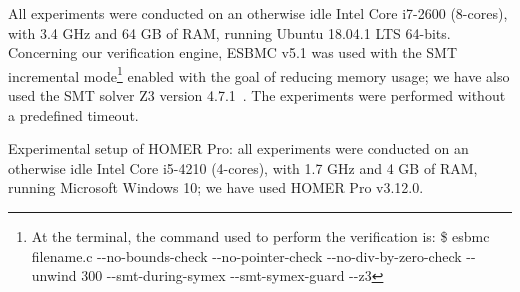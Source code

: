 \documentclass[journal]{IEEEtran}
\begin{document}
All experiments were conducted on an otherwise idle Intel Core i7-2600 (8-cores), with 3.4 GHz and 64 GB of RAM, running Ubuntu 18.04.1 LTS 64-bits. Concerning our verification engine, ESBMC v5.1 was used with the SMT incremental mode\footnote{At the terminal, the command used to perform the verification is: \$ esbmc filename.c -\phantom{}-no-bounds-check -\phantom{}-no-pointer-check -\phantom{}-no-div-by-zero-check -\phantom{}-unwind 300 -\phantom{}-smt-during-symex -\phantom{}-smt-symex-guard -\phantom{}-z3} enabled with the goal of reducing memory usage; we have also used the SMT solver Z3 version 4.7.1~\cite{DeMoura}. The experiments were performed without a predefined timeout.

Experimental setup of HOMER Pro: all experiments were conducted on an otherwise idle Intel Core i5-4210 (4-cores), with 1.7 GHz and 4 GB of RAM, running Microsoft Windows 10; we have used HOMER Pro v3.12.0.

\end{document}
